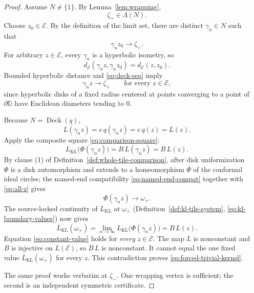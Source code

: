 \documentclass[11pt,reqno]{amsart}
\theoremstyle{definition}
\theoremstyle{remark}
\begin{document}
\begin{proof}
Assume \(N\ne\{1\}\).  By Lemma~\ref{lem:wrapping},
\[
\zeta_+\in\Lambda(N).
\]
Choose \(z_0\in\mathcal E\).  By the definition of the limit set, there are distinct \(\gamma_n\in N\) such that
\begin{equation}\label{eq:deck-seq}
\gamma_nz_0\longrightarrow\zeta_+.
\end{equation}
For arbitrary \(z\in\mathcal E\), every \(\gamma_n\) is a hyperbolic isometry, so
\begin{equation}\label{eq:isometry}
d_{\mathcal E}(\gamma_nz,\gamma_nz_0)=d_{\mathcal E}(z,z_0).
\end{equation}
Bounded hyperbolic distance and \eqref{eq:deck-seq} imply
\begin{equation}\label{eq:all-z}
\gamma_nz\longrightarrow\zeta_+\qquad\text{for every }z\in\mathcal E,
\end{equation}
since hyperbolic disks of a fixed radius centered at points converging to a point of \(\partial\mathbb D\) have Euclidean diameters tending to \(0\).

Because \(N=\operatorname{Deck}(q)\),
\begin{equation}\label{eq:deck-invariance}
L(\gamma_nz)=e\,q(\gamma_nz)=e\,q(z)=L(z).
\end{equation}
Apply the composite square \eqref{eq:comparison-square}:
\begin{equation}\label{eq:square-applied}
L_{\mathrm{KL}}\bigl(\Phi(\gamma_nz)\bigr)=B\,L(\gamma_nz)=B\,L(z).
\end{equation}
By clause (1) of Definition~\ref{def:whole-tile-comparison}, after disk uniformization \(\Phi\) is a disk automorphism and extends to a homeomorphism \(\overline\Phi\) of the conformal ideal circles; the named-end compatibility \eqref{eq:named-end-compat} together with \eqref{eq:all-z} gives
\begin{equation}\label{eq:phi-limit}
\Phi(\gamma_nz)\longrightarrow\omega_+.
\end{equation}
The source-locked continuity of \(L_{\mathrm{KL}}\) at \(\omega_+\) (Definition~\ref{def:kl-tile-system}, \eqref{eq:kl-boundary-values}) now gives
\begin{equation}\label{eq:constant-value}
\overline L_{\mathrm{KL}}(\omega_+)=\lim_{n\to\infty}L_{\mathrm{KL}}\bigl(\Phi(\gamma_nz)\bigr)=B\,L(z).
\end{equation}
Equation \eqref{eq:constant-value} holds for \emph{every} \(z\in\mathcal E\).  The map \(L\) is nonconstant and \(B\) is injective on \(L(\mathcal E)\), so \(B\,L\) is nonconstant.  It cannot equal the one fixed value \(\overline L_{\mathrm{KL}}(\omega_+)\) for every \(z\).  This contradiction proves \eqref{eq:forced-trivial-kernel}.

The same proof works verbatim at \(\zeta_-\).  One wrapping vertex is sufficient; the second is an independent symmetric certificate.
\end{proof}
\end{document}
